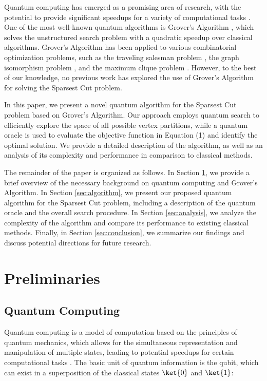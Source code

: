 Quantum computing has emerged as a promising area of research, with the potential to provide significant speedups for a variety of computational tasks \cite{nielsen2010quantum}. One of the most well-known quantum algorithms is Grover's Algorithm \cite{grover1996fast}, which solves the unstructured search problem with a quadratic speedup over classical algorithms. Grover's Algorithm has been applied to various combinatorial optimization problems, such as the traveling salesman problem \cite{zalka1999grover}, the graph isomorphism problem \cite{childs2017quantum}, and the maximum clique problem \cite{dridi2017quantum}. However, to the best of our knowledge, no previous work has explored the use of Grover's Algorithm for solving the Sparsest Cut problem.

In this paper, we present a novel quantum algorithm for the Sparsest Cut problem based on Grover's Algorithm. Our approach employs quantum search to efficiently explore the space of all possible vertex partitions, while a quantum oracle is used to evaluate the objective function in Equation (1) and identify the optimal solution. We provide a detailed description of the algorithm, as well as an analysis of its complexity and performance in comparison to classical methods.

The remainder of the paper is organized as follows. In Section \ref{sec:preliminaries}, we provide a brief overview of the necessary background on quantum computing and Grover's Algorithm. In Section \ref{sec:algorithm}, we present our proposed quantum algorithm for the Sparsest Cut problem, including a description of the quantum oracle and the overall search procedure. In Section \ref{sec:analysis}, we analyze the complexity of the algorithm and compare its performance to existing classical methods. Finally, in Section \ref{sec:conclusion}, we summarize our findings and discuss potential directions for future research.

\section{Preliminaries}
\label{sec:preliminaries}

\subsection{Quantum Computing}

Quantum computing is a model of computation based on the principles of quantum mechanics, which allows for the simultaneous representation and manipulation of multiple states, leading to potential speedups for certain computational tasks \cite{nielsen2010quantum}. The basic unit of quantum information is the qubit, which can exist in a superposition of the classical states $\ket{0}$ and $\ket{1}$:

